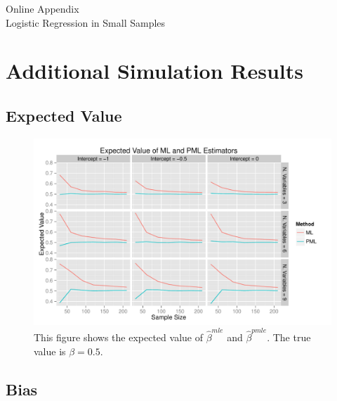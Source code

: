 \documentclass[12pt]{article}
\begin{document}
\singlespace 
\newpage
\normalsize


%

\newpage
\begin{appendix}
\begin{center}
{\LARGE Online Appendix}\\
\vspace{3mm}
{\large Logistic Regression in Small Samples}\\\vspace{2mm}
\end{center}

\section{Additional Simulation Results}\label{sec:app-sims}

\subsection{Expected Value}

\begin{figure}[H]
\begin{center}
\includegraphics[width = \textwidth]{figs/sims-ev.pdf}
\caption{This figure shows the expected value of $\hat{\beta}^{mle}$ and $\hat{\beta}^{pmle}$. The true value is $\beta = 0.5$.}\label{fig:ev}
\end{center}
\end{figure}

\subsection{Bias}


\end{appendix}
\end{document}
